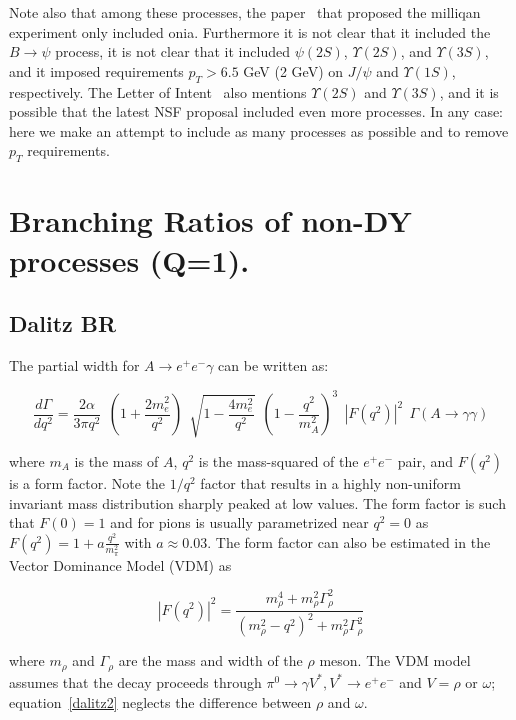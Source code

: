 \documentclass[12pt]{article}
\begin{document}
Note also that among these processes, the paper~\cite{Haas:2014dda} that
proposed the milliqan experiment only included onia.  Furthermore
it is not clear that it included the $B \to \psi$ process, it
is not clear that it included $\psi(2S)$, $\Upsilon(2S)$,
and $\Upsilon(3S)$, and it imposed requirements $p_T > 6.5$ GeV (2 GeV)
on $J/\psi$ and $\Upsilon(1S)$, respectively.
The Letter of Intent~\cite{Ball:2016zrp} also mentions
$\Upsilon(2S)$ and $\Upsilon(3S)$, and it is possible that the latest
NSF proposal included even more processes.  In any case: here we make an
attempt to include as many processes as possible and to
remove $p_T$ requirements.


\section{Branching Ratios of non-DY processes (Q=1).}

\subsection{Dalitz BR}

The partial width for $A \to e^+ e^- \gamma$ can be written
as\cite{landsberg, bib:ulrik}:

\begin{equation}
\frac{d \Gamma}{d q^2} = \frac{2 \alpha}{3 \pi q^2}~~
(1+\frac{2m_e^2}{q^2})~~\sqrt{1 - \frac{4m_e^2}{q^2}}~~
(1 - \frac{q^2}{m_A^2})^3~~
|F(q^2)|^2 ~~
\Gamma(A \to \gamma \gamma) 
\label{dalitz1}
\end{equation}

\noindent where $m_A$ is the mass of $A$, $q^2$ is the mass-squared of the
$e^+e^-$ pair, 
and $F(q^2)$ is a form factor.  Note the $1/q^2$ factor that results
in a highly non-uniform invariant mass distribution sharply peaked at
low
values.
The form factor is such that $F(0)=1$ and for pions is usually
parametrized near $q^2=0$ as $F(q^2) = 1 + a \frac{q^2}{m_\pi^2}$ with
$a \approx 0.03$.  The form factor can also be estimated in the Vector
Dominance Model (VDM) as

\begin{equation}
  |F(q^2)|^2 = \frac{m^4_\rho + m^2_\rho \Gamma^2_\rho}{(m_\rho^2 - q^2)^2 + m^2_\rho \Gamma^2_\rho}
  \label{dalitz2}
\end{equation}

\noindent where $m_\rho$ and $\Gamma_\rho$ are the mass and width of the
$\rho$ meson.  The VDM model assumes that the decay proceeds through
$\pi^0 \to \gamma V^*, V^* \to e^+e^-$ and $V= \rho$ or $\omega$;
equation~\ref{dalitz2} neglects the difference between $\rho$ and $\omega$.
\end{document}
